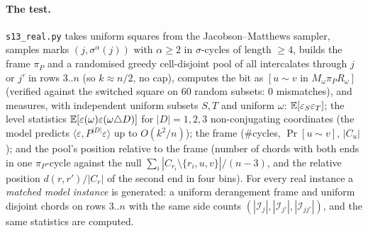 \paragraph{The test.}  \texttt{s13\_real.py} takes uniform squares
from the Jacobson--Matthews sampler, samples marks
$(j,\sigma^\alpha(j))$ with $\alpha\ge2$ in $\sigma$-cycles of length
$\ge4$, builds the frame $\pi_P$ and a randomised greedy cell-disjoint
pool of all intercalates through $j$ or $j'$ in rows $3..n$ (so
$k\approx n/2$, no cap), computes the bit as
$[u\sim v\text{ in }M_\omega\pi_P R_\omega]$ (verified against the
switched square on $60$ random subsets: $0$ mismatches), and measures,
with independent uniform subsets $S,T$ and uniform $\omega$:
$\mathbb{E}[\varepsilon_S\varepsilon_T]$; the level statistics
$\mathbb{E}[\varepsilon(\omega)\varepsilon(\omega\triangle D)]$ for
$|D|=1,2,3$ non-conjugating coordinates (the model predicts
$\langle\varepsilon,P^{|D|}\varepsilon\rangle$ up to $O(k^2/n)$); the
frame ($\#$cycles, $\Pr[u\sim v]$, $|C_u|$); and the pool's position
relative to the frame (number of chords with both ends in one
$\pi_P$-cycle against the null $\sum_i|C_{r_i}\setminus\{r_i,u,v\}|/(n-3)$,
and the relative position $d(r,r')/|C_r|$ of the second end in four
bins).  For every real instance a \emph{matched model instance} is
generated: a uniform derangement frame and uniform disjoint chords on
rows $3..n$ with the same side counts $(|\mathcal I_j|,|\mathcal I_{j'}|,|\mathcal I_{jj'}|)$,
and the same statistics are computed.

